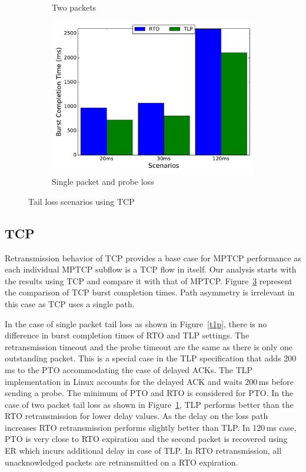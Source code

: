 \documentclass[10pt,conference,compsoc]{IEEEtran}
\begin{document}
\begin{figure}[!tbp]
\begin{subfigure}[b]{0.32\textwidth}
	\caption{Two packets }\label{t2p}
 \end{subfigure}
 \hfill
 \begin{subfigure}[b]{0.32\textwidth}
	\includegraphics[angle=0, width=\textwidth, natwidth=578.16,natheight=433.62]{plots/T1PP.pdf}
	\caption{Single packet and probe loss }\label{t1pp}
 \end{subfigure}
 \caption{Tail loss scenarios using TCP}\label{tcpf}
\end{figure}
\subsection{TCP}
Retransmission behavior of TCP provides a base case for MPTCP performance as each individual MPTCP subflow is a TCP flow in itself. Our analysis
starts with the results using TCP and compare it with that of MPTCP. Figure~\ref{tcpf} represent the comparison of TCP 
burst completion times. Path asymmetry is irrelevant in this case as TCP uses a single path.

In the case of single packet tail loss as shown in Figure~\ref{t1p}, there is no difference in burst completion times of RTO and TLP settings. The retransmission
timeout and the probe timeout are the same as there is only one outstanding packet. This is a special case in the TLP
specification that adds 200\,ms to the PTO accommodating the case of delayed ACKs. The TLP implementation in Linux accounts
for the delayed ACK and waits 200\,ms before sending a probe. The minimum of PTO and RTO is considered for PTO. In the case of two packet tail loss as shown in Figure~\ref{t2p},
TLP performs better than the RTO retransmission for lower delay values. As the delay on the loss path increases RTO retransmission performs slightly better than TLP. In 120\,ms case, PTO is very close to RTO expiration and the second packet is recovered using ER which incurs additional delay in case of TLP. In RTO retransmission, all unacknowledged packets are retransmitted on a RTO expiration. 
\end{document}
